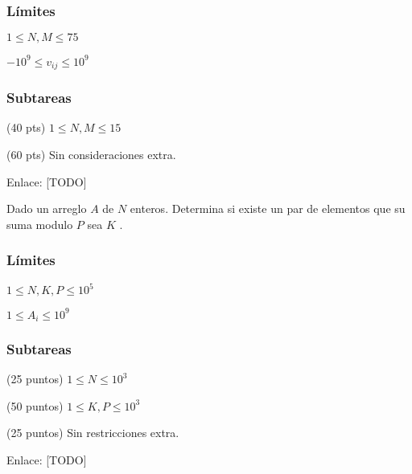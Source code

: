 \subsubsection*{Límites}

\begin{plimits}
	\item \(1\leq N, M\leq 75 \)
	\item \(-10^9\leq v_{ij}\leq 10^9 \)
\end{plimits}

\subsubsection*{Subtareas}

\begin{plimits}
	\item (40 pts) \(1\leq N, M\leq 15 \)
	\item (60 pts) Sin consideraciones extra.
\end{plimits}

Enlace: [TODO]

\problembreak

\problemtitle Dado un arreglo \(A\) de \(N\) enteros. Determina si existe un par de elementos que su suma modulo \(P\) sea \(K\) .

\subsubsection*{Límites}
\begin{plimits}
	\item \(1\leq N,K,P\leq 10^5 \)
	\item \(1\leq A_i\leq 10^9 \)
\end{plimits}

\subsubsection*{Subtareas}
\begin{plimits}
	\item (25 puntos) \(1\leq N\leq 10^3 \)
	\item (50 puntos) \(1\leq K, P\leq 10^3 \)
	\item (25 puntos) Sin restricciones extra.
\end{plimits}

Enlace: [TODO]